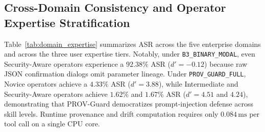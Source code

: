 \documentclass[10pt,twocolumn,letterpaper]{article}
\begin{document}
\begin{table}[t]
\centering
\caption{Attack Success Rate (ASR \%) Breakdown Across the 5 Injection Taxonomy Families.}
\label{tab:taxonomy_results}
\end{table}

\subsection{Cross-Domain Consistency and Operator Expertise Stratification}
Table~\ref{tab:domain_expertise} summarizes ASR across the five enterprise domains and across the three user expertise tiers. Notably, under \texttt{B3\_BINARY\_MODAL}, even Security-Aware operators experience a $92.38\%$ ASR ($d' = -0.12$) because raw JSON confirmation dialogs omit parameter lineage. Under \texttt{PROV\_GUARD\_FULL}, Novice operators achieve a $4.33\%$ ASR ($d' = 3.88$), while Intermediate and Security-Aware operators achieve $1.62\%$ and $1.67\%$ ASR ($d' = 4.51$ and $4.24$), demonstrating that PROV-Guard democratizes prompt-injection defense across skill levels. Runtime provenance and drift computation requires only $0.084\,\text{ms}$ per tool call on a single CPU core.
\end{document}
